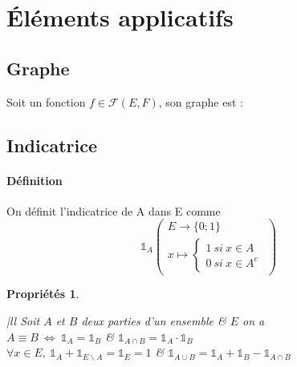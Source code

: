 	\section{Éléments applicatifs}
	\subsection{Graphe}
		Soit un fonction $f\in\mathcal{F}(E,F)$, son graphe est :\begin{center}  \end{center}
	\subsection{Indicatrice}
		\traitd
 		\paragraph{Définition}
 			On définit l'indicatrice de A dans E comme 
 			\[\mathbb{1} _A \left( \begin{array}{l} E\longrightarrow \{0;1\} \\ x\mapsto \left\{ \begin{array}{l} 1~si~x\in A \\ 0~si~x\in A^c 
 			\end{array} \right. \end{array} \right)\] \vspace*{-0.7cm} \trait
 		\hspace*{1.5cm} \newtheorem*{ch2P2}{Propriétés}  \begin{minipage}{12.71cm} \begin{ch2P2} ${}$ \vspace*{0.15cm}\\ \hspace*{0.21cm} 			
 		\begin{blockarray}{|ll}
 		Soit $A$ et $B$ deux parties d'un ensemble & \hspace*{-0.25cm}$E$ on a  \\
 		$A \equiv B ~\Leftrightarrow ~ \mathbb{1}_A = \mathbb{1}_B$ & $\mathbb{1}_{A\cap B } = \mathbb{1}_A \cdot \mathbb{1}_B$ \\ 
 		$\forall x\in E ,~\mathbb{1}_A + \mathbb{1}_{E\backslash A} = \mathbb{1}_E = 1$ & $\mathbb{1}_{A\cup B} = \mathbb{1}_A + \mathbb{1}_B - 
 		\mathbb{1}_{A\cap B}$
 		\end{blockarray} \end{ch2P2} \end{minipage} \vspace*{-0.25cm} ${}$
